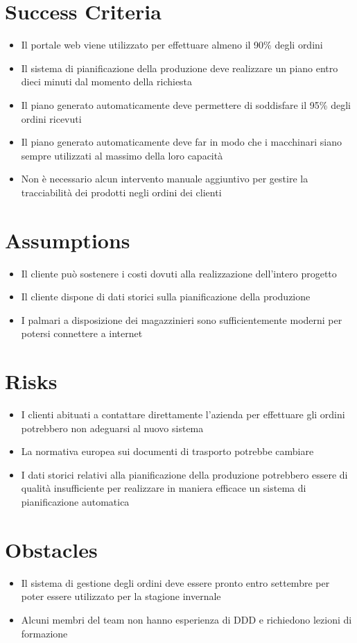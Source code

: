 \section{Success Criteria} %
\begin{itemize}
  \item Il portale web viene utilizzato per effettuare almeno il 90\% degli ordini
  \item Il sistema di pianificazione della produzione deve realizzare un piano entro dieci minuti dal momento della richiesta
  \item Il piano generato automaticamente deve permettere di soddisfare il 95\% degli ordini ricevuti
  \item Il piano generato automaticamente deve far in modo che i macchinari siano sempre utilizzati al massimo della loro capacità
  \item Non è necessario alcun intervento manuale aggiuntivo per gestire la tracciabilità dei prodotti negli ordini dei clienti
\end{itemize}

\section{Assumptions}
\begin{itemize}
  \item Il cliente può sostenere i costi dovuti alla realizzazione dell'intero progetto
  \item Il cliente dispone di dati storici sulla pianificazione della produzione
  \item I palmari a disposizione dei magazzinieri sono sufficientemente moderni per potersi connettere a internet
\end{itemize}

\section{Risks}
\begin{itemize}
  \item I clienti abituati a contattare direttamente l'azienda per effettuare gli ordini potrebbero non adeguarsi al nuovo sistema
  \item La normativa europea sui documenti di trasporto potrebbe cambiare
  \item I dati storici relativi alla pianificazione della produzione potrebbero essere di qualità insufficiente per realizzare in maniera efficace un sistema di pianificazione automatica
\end{itemize}

\section{Obstacles}
\begin{itemize}
  \item Il sistema di gestione degli ordini deve essere pronto entro settembre per poter essere utilizzato per la stagione invernale
  \item Alcuni membri del team non hanno esperienza di DDD e richiedono lezioni di formazione
\end{itemize}


